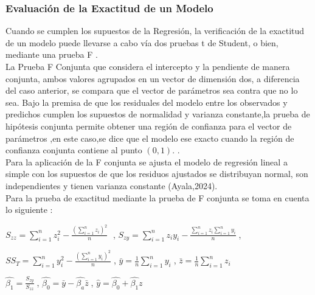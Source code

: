 \subsubsection{Evaluación de la Exactitud de un Modelo}

Cuando se cumplen los supuestos de la Regresión, la verificación de la exactitud de un modelo puede llevarse a cabo vía dos pruebas t de Student, o bien, mediante una prueba F \parencite{balam-2012}.\\

La Prueba F Conjunta que considera el intercepto y la pendiente de manera conjunta, ambos valores agrupados en un vector de dimensión dos, a diferencia del caso anterior, se compara que el vector de parámetros  sea  contra que no lo sea. Bajo la premisa de que los residuales del modelo entre los observados y predichos cumplen los supuestos de normalidad y varianza constante,la prueba de hipótesis conjunta permite obtener una región de confianza para el vector de parámetros ,en este caso,se dice que el modelo ese exacto cuando la región de confianza conjunta contiene al punto $(0,1)$. \parencite{zacarias-2023}.\\

Para la aplicación de la F conjunta se ajusta el modelo de regresión lineal a simple con los supuestos de que los residuos ajustados se distribuyan normal, son independientes y tienen varianza constante (Ayala,2024).\\

Para la prueba de exactitud mediante la prueba de F conjunta se toma en cuenta lo siguiente \parencite{montgomery-2012}: 

\begin{center}
	$S_{zz} = \sum_{i=1}^{n}z_{i}^{2} - \frac{( \sum_{i=1}^{n} z_{i})^{2}}{n} \;$ ,
	$S_{zy} = \sum_{i=1}^{n}z_{i} y_{i} - \frac{ \sum_{i=1}^{n} z_{i} \sum_{i=1}^{n} y_{i} }{n} \;$,\\
\end{center}

\begin{center}
	$SS_{T} = \sum_{i=1}^{n}y_{i}^{2} - \frac{( \sum_{i=1}^{n} y_{i})^{2}}{n} \;$, $\bar{y} = \frac{1}{n} \sum_{i=1}^{n} y_{i} \; $, $\bar{z} = \frac{1}{n} \sum_{i=1}^{n} z_{i} $ \\
\end{center}


\begin{center}
	$ \hat{\beta_{1}} = \frac{S_{zy}}{S_{zz}}  \;$, $\hat{\beta_{0}} =  \bar{y} - \hat{\beta_{a}} \bar{z}  \; $, $\hat{y} = \hat{\beta_{0}}  + \hat{\beta_{1}}z $ \\
\end{center}

